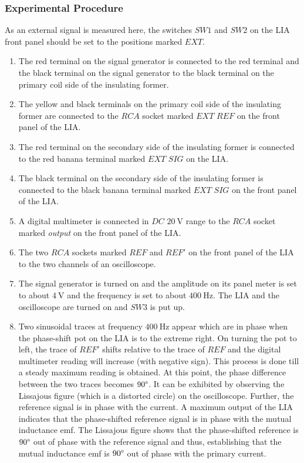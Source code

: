 \documentclass[%
 reprint,
nofootinbib,
 amsmath,amssymb,
 aps,
]{revtex4-2}
\begin{document}
        
        \subsubsection{Experimental Procedure}
            As an external signal is measured here, the switches $SW1$ and $SW2$ on the LIA front panel should be set to the positions marked $EXT$.
            \begin{enumerate}
                \item The red terminal on the signal generator is connected to the red terminal and the black terminal on the signal generator to the black terminal on the primary coil side of the insulating former.
                \item The yellow and black terminals on the primary coil side of the insulating former are connected to the $RCA$ socket marked $EXT$ $REF$ on the front panel of the LIA.
                \item The red terminal on the secondary side of the insulating former is connected to the red banana terminal marked $EXT$ $SIG$ on the LIA.
                \item The black terminal on the secondary side of the insulating former is connected to the black banana terminal marked $EXT$ $SIG$ on the front panel of the LIA.
                \item A digital multimeter is connected in $DC$ $\SI{20}{\volt}$ range to the $RCA$ socket marked \textit{output} on the front panel of the LIA.
                \item The two $RCA$ sockets marked $REF$ and $REF'$ on the front panel of the LIA to the two channels of an oscilloscope.
                \item The signal generator is turned on and the amplitude on its panel meter is set to about $\SI{4}{\volt}$ and the frequency is set to about $\SI{400}{\hertz}$. The LIA and the oscilloscope are turned on and $SW3$ is put up.
                \item Two sinusoidal traces at frequency $\SI{400}{\hertz}$ appear which are in phase when the phase-shift pot on the LIA is to the extreme right. On turning the pot to left, the trace of $REF'$ shifts relative to the trace of $REF$ and the digital multimeter reading will increase (with negative sign). This process is done till a steady maximum reading is obtained. At this point, the phase difference between the two traces becomes $90 \degree$. It can be exhibited by observing the Lissajous figure (which is a distorted circle) on the oscilloscope. Further, the reference signal is in phase with the current. A maximum output of the LIA indicates that the phase-shifted reference signal is in phase with the mutual inductance emf. The Lissajous figure shows that the phase-shifted reference is $90 \degree$ out of phase with the reference signal and thus, establishing that the mutual inductance emf is $90 \degree$ out of phase with the primary current.

\end{enumerate}
\end{document}
